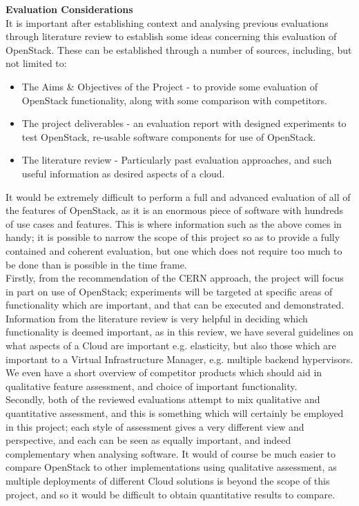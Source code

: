 \textbf{Evaluation Considerations}\\
It is important after establishing context and analysing previous evaluations through literature review to establish some ideas concerning this evaluation of OpenStack. These can be established through a number of sources, including, but not limited to:

\begin{itemize}
\itemsep0em
\item The Aims \& Objectives of the Project - to provide some evaluation of OpenStack functionality, along with some comparison with competitors. 
\item The project deliverables - an evaluation report with designed experiments to test OpenStack, re-usable software components for use of OpenStack. 
\item The literature review - Particularly past evaluation approaches, and such useful information as desired aspects of a cloud. 
\end{itemize}

It would be extremely difficult to perform a full and advanced evaluation of all of the features of OpenStack, as it is an enormous piece of software with hundreds of use cases and features. This is where information such as the above comes in handy; it is possible to narrow the scope of this project so as to provide a fully contained and coherent evaluation, but one which does not require too much to be done than is possible in the time frame. \\

Firstly, from the recommendation of the CERN approach, the project will focus in part on use of OpenStack; experiments will be targeted at specific areas of functionality which are important, and that can be executed and demonstrated. Information from the literature review is very helpful in deciding which functionality is deemed important, as in this review, we have several guidelines on what aspects of a Cloud are important e.g. elasticity, but also those which are important to a Virtual Infrastructure Manager, e.g. multiple backend hypervisors. We even have a short overview of competitor products which should aid in qualitative feature assessment, and choice of important functionality. \\

Secondly, both of the reviewed evaluations attempt to mix qualitative and quantitative assessment, and this is something which will certainly be employed in this project; each style of assessment gives a very different view and perspective, and each can be seen as equally important, and indeed complementary when analysing software. It would of course be much easier to compare OpenStack to other implementations using qualitative assessment, as multiple deployments of different Cloud solutions is beyond the scope of this project, and so it would be difficult to obtain quantitative results to compare. \\

